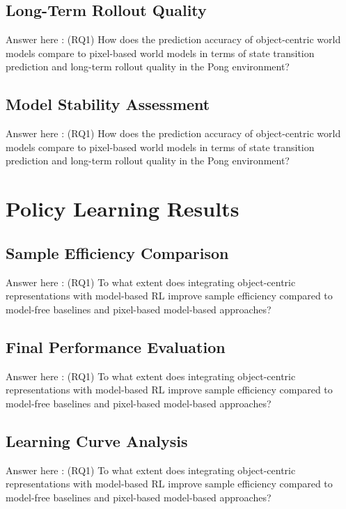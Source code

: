 \documentclass[
	english,
	ruledheaders=section,
	class=report,
	thesis={type=master},
	accentcolor=9c,
	custommargins=true,
	marginpar=false,
	parskip=half-,
	fontsize=11pt,
]{tudapub}
\begin{document}
\subsection{Long-Term Rollout Quality}
\label{subsec:rollout_quality}
Answer here : (RQ1) How does the prediction accuracy of object-centric world models compare to pixel-based world models in terms of state transition prediction and long-term rollout quality in the Pong environment?

\subsection{Model Stability Assessment}
\label{subsec:stability}
Answer here : (RQ1) How does the prediction accuracy of object-centric world models compare to pixel-based world models in terms of state transition prediction and long-term rollout quality in the Pong environment?

\section{Policy Learning Results}
\label{sec:policy_results}

\subsection{Sample Efficiency Comparison}
\label{subsec:sample_efficiency_comp}
Answer here : (RQ1) To what extent does integrating object-centric representations with model-based RL improve sample efficiency compared to model-free baselines and pixel-based model-based approaches?

\subsection{Final Performance Evaluation}
\label{subsec:final_performance}
Answer here : (RQ1) To what extent does integrating object-centric representations with model-based RL improve sample efficiency compared to model-free baselines and pixel-based model-based approaches?

\subsection{Learning Curve Analysis}
\label{subsec:learning_curves}
Answer here : (RQ1) To what extent does integrating object-centric representations with model-based RL improve sample efficiency compared to model-free baselines and pixel-based model-based approaches?
\end{document}
